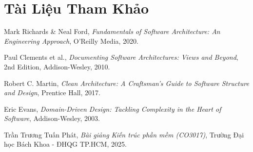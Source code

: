 \chapter*{Tài Liệu Tham Khảo}

\begin{enumerate}[label={[\arabic*]}]
    \item Mark Richards \& Neal Ford, \textit{Fundamentals of Software Architecture: An Engineering Approach}, O'Reilly Media, 2020.
    \item Paul Clements et al., \textit{Documenting Software Architectures: Views and Beyond}, 2nd Edition, Addison-Wesley, 2010.
    \item Robert C. Martin, \textit{Clean Architecture: A Craftsman's Guide to Software Structure and Design}, Prentice Hall, 2017.
    \item Eric Evans, \textit{Domain-Driven Design: Tackling Complexity in the Heart of Software}, Addison-Wesley, 2003.
    \item Trần Trương Tuấn Phát, \textit{Bài giảng Kiến trúc phần mềm (CO3017)}, Trường Đại học Bách Khoa - ĐHQG TP.HCM, 2025.
\end{enumerate}
